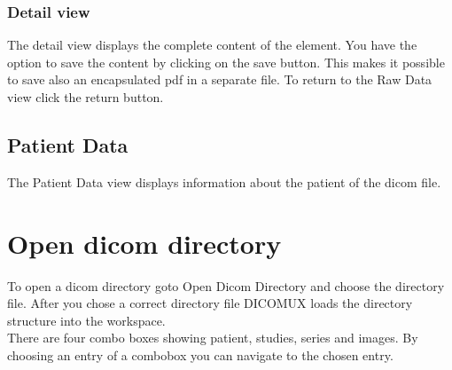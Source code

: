 		\subsubsection{Detail view}
		The detail view displays the complete content of the element. You have the
		option to save the content by clicking on the save button. This makes it
		possible to save also an encapsulated pdf in a separate file.
		To return to the Raw Data view click the return button.\\
		
		\begin{minipage}{\textwidth} 
		\centering
		\label{fig:bild}
		\end{minipage}
		
	\subsection{Patient Data}
	The Patient Data view displays information about the patient of the dicom
	file.\\
	
	\begin{minipage}{\textwidth} 
	\centering
	\label{fig:bild}
	\end{minipage}
	
\section{Open dicom directory}
To open a dicom directory goto Open Dicom Directory and choose the directory
file. After you chose a correct directory file DICOMUX loads the directory
structure into the workspace.\\
There are four combo boxes showing patient, studies, series and images. By
choosing an entry of a combobox you can navigate to the chosen entry.\\

